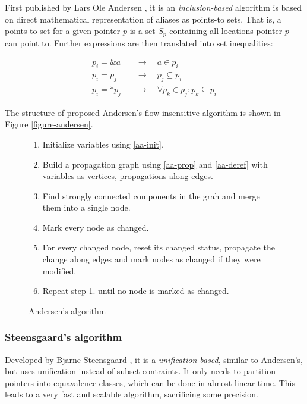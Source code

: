 First published by Lars Ole Andersen \cite{Andersen94}, it is an {\it
inclusion-based} algorithm is based on direct mathematical representation of
aliases as points-to sets. That is, a points-to set for a given pointer $p$ is a
set $S_p$ containing all locations pointer $p$ can point to.  Further
expressions are then translated into set inequalities:

\begin{align}
	\label{aa-init}
	p_i = \&a \quad &\to \quad a \in p_i \\
	\label{aa-prop}
	p_i = p_j \quad &\to \quad p_j \subseteq p_i \\
	\label{aa-deref}
	p_i = *p_j \quad &\to \quad \forall p_k \in p_j : p_k \subseteq p_i
\end{align}

The structure of proposed Andersen's flow-insensitive algorithm is shown in Figure
\ref{figure-andersen}.

\begin{figure}[h!]
\label{figure-andersen}
\begin{tcolorbox}
\begin{enumerate}
	\item Initialize variables using \ref{aa-init}.
	\item Build a propagation graph using \ref{aa-prop} and \ref{aa-deref}
		with variables as vertices, propagations along edges.
	\item Find strongly connected components in the grah and merge them into a single node.
	\item Mark every node as changed.
	\item For every changed node, reset its changed status, propagate the change
		along edges and mark nodes as changed if they were modified.
	\label{aa-propstep} 
	\item Repeat step \ref{aa-propstep}. until no node is marked as changed.
\end{enumerate}
\end{tcolorbox}
\caption{Andersen's algorithm}
\end{figure}

\subsubsection{Steensgaard's algorithm}

Developed by Bjarne Steensgaard \cite{Steensgaard96}, it is  a {\it
unification-based}, similar to Andersen's, but uses unification instead of
subset contraints. It only needs to partition pointers into equavalence
classes, which can be done in almost linear time. This leads to a very fast and
scalable algorithm, sacrificing some precision.

